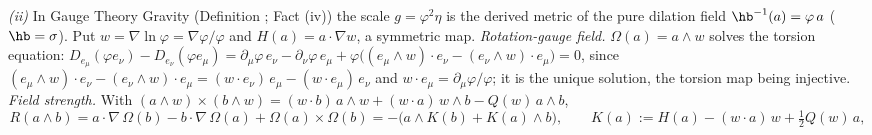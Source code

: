 \emph{(ii)} In Gauge Theory Gravity (Definition ; Fact (iv)) the scale $g = \varphi^{2}\eta$ is the derived metric of the pure dilation field $\hb^{-1}(a) = \varphi\,a$ ($\hb = \sigma$). Put $w = \nabla\ln\varphi = \nabla\varphi/\varphi$ and $H(a) = a\cdot\nabla w$, a symmetric map. \emph{Rotation-gauge field.} $\Omega(a) = a \wedge w$ solves the torsion equation: $D_{e_\mu}(\varphi e_{\nu}) - D_{e_\nu}(\varphi e_{\mu}) = \partial_{\mu}\varphi\,e_{\nu} - \partial_{\nu}\varphi\,e_{\mu} + \varphi\bigl((e_{\mu}\wedge w)\cdot e_{\nu} - (e_{\nu}\wedge w)\cdot e_{\mu}\bigr) = 0$, since $(e_{\mu}\wedge w)\cdot e_{\nu} - (e_{\nu}\wedge w)\cdot e_{\mu} = (w\cdot e_{\nu})\,e_{\mu} - (w\cdot e_{\mu})\,e_{\nu}$ and $w\cdot e_{\mu} = \partial_{\mu}\varphi/\varphi$; it is the unique solution, the torsion map being injective. \emph{Field strength.} With $(a\wedge w)\times(b\wedge w) = (w\cdot b)\,a\wedge w + (w\cdot a)\,w\wedge b - Q(w)\,a\wedge b$,
\[
R(a\wedge b) = a\cdot\nabla\,\Omega(b) - b\cdot\nabla\,\Omega(a) + \Omega(a)\times\Omega(b) = -\bigl(a\wedge K(b) + K(a)\wedge b\bigr), \qquad K(a) := H(a) - (w\cdot a)\,w + \tfrac12 Q(w)\,a,
\]
